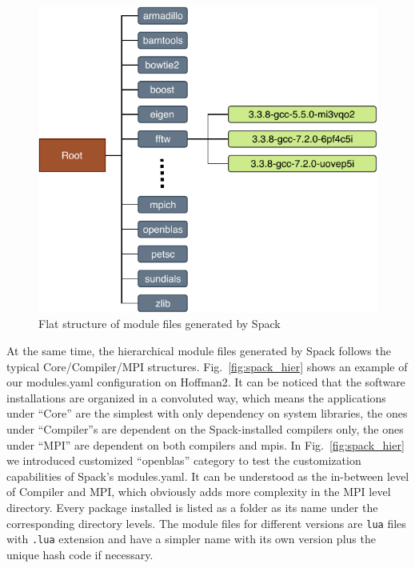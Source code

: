 \documentclass[conference]{IEEEtran}
\begin{document}
\begin{figure}[htbp]
  \centerline{\includegraphics[width=\linewidth]{figures/spack_flat}}
  \caption{Flat structure of module files generated by Spack}
  \label{fig:spack_flat}
\end{figure}

At the same time, the hierarchical module files generated by Spack follows the typical Core/Compiler/MPI structures. Fig.~\ref{fig:spack_hier} shows an example of our modules.yaml configuration on Hoffman2. It can be noticed that the software installations are organized in a convoluted way, which means the applications under ``Core'' are the simplest with only dependency on system libraries, the ones under ``Compiler''s are dependent on the Spack-installed compilers only, the ones under ``MPI'' are dependent on both compilers and mpis. In Fig.~\ref{fig:spack_hier} we introduced customized ``openblas'' category to test the customization capabilities of Spack's modules.yaml. It can be understood as the in-between level of Compiler and MPI, which obviously adds more complexity in the MPI level directory. Every package installed is listed as a folder as its name under the corresponding directory levels. The module files for different versions are \texttt{lua} files with \texttt{.lua} extension and have a simpler name with its own version plus the unique hash code if necessary.
\end{document}
